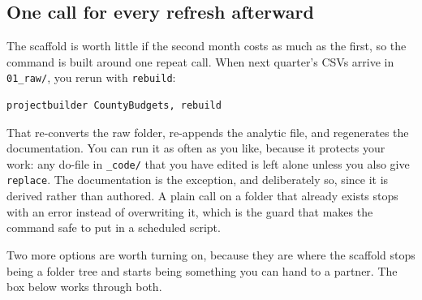 \subsection{One call for every refresh afterward}\label{sec:ch02-pb-rebuild}
The scaffold is worth little if the second month costs as much as the first, so the command is built around one repeat call. When next quarter's CSVs arrive in \texttt{01\_raw/}, you rerun with \texttt{rebuild}:
\par
{\footnotesize
\begin{verbatim}
projectbuilder CountyBudgets, rebuild
\end{verbatim}
}
That re-converts the raw folder, re-appends the analytic file, and regenerates the documentation. You can run it as often as you like, because it protects your work: any do-file in \texttt{\_code/} that you have edited is left alone unless you also give \texttt{replace}. The documentation is the exception, and deliberately so, since it is derived rather than authored. A plain call on a folder that already exists stops with an error instead of overwriting it, which is the guard that makes the command safe to put in a scheduled script.

Two more options are worth turning on, because they are where the scaffold stops being a folder tree and starts being something you can hand to a partner. The box below works through both.

